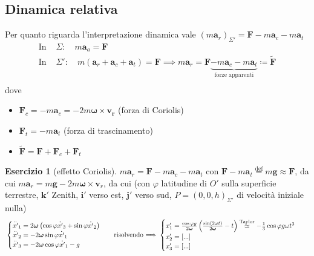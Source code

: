 \documentclass[a4paper,10pt]{article}
\providecommand{\exercisename}{Esercizio}
\theoremstyle{definition}
\newtheorem*{xca*}{\protect\exercisename}
\newcommand{\bv}{\boldsymbol} %
\theoremstyle{indentdefinition}
\theoremstyle{indenttheorem}
\theoremstyle{myremark}
\theoremstyle{indentgeneral}
\begin{document}
\subsection{Dinamica relativa}
Per quanto riguarda l'interpretazione dinamica vale $\left(m\boldsymbol{a}_{r}\right)_{\Sigma'}=\boldsymbol{F}-m\boldsymbol{a}_{c}-m\boldsymbol{a}_{t}$
\begin{align*}
    \text{In }&\Sigma:\quad m\bv{a}_a=\bv{F} \\
    \text{In }&\Sigma':\quad m(\bv{a}_r+\bv{a}_c+\bv{a}_t)=\bv{F} \implies m\bv{a}_r=\bv{F}\underbrace{-m\bv{a}_c-m\bv{a}_t}_{\text{forze apparenti}} \coloneqq \widetilde{\bv{F}}\\
\end{align*}
dove
\begin{itemize}
    \item $\bv{F}_c=-m\bv{a}_c=-2m\bv{\omega\times\bv{v}_r}$ (forza di Coriolis)
    \item $\bv{F}_t=-m\bv{a}_t$ (forza di trascinamento)
    \item $\widetilde{\bv{F}}=\bv{F}+\bv{F}_c+\bv{F}_t$
\end{itemize}

%
\begin{xca*}[effetto Coriolis]
$m\boldsymbol{a}_{r}=\boldsymbol{F}-m\boldsymbol{a}_{c}-m\boldsymbol{a}_{t}$
con $\boldsymbol{F}-m\boldsymbol{a}_{t}\overset{\text{def}}{=}m\boldsymbol{g}\approx\boldsymbol{F}$,
da cui $m\boldsymbol{a}_{r}=m\boldsymbol{g}-2m\boldsymbol{\omega}\times\boldsymbol{v}_{r}$,
da cui (con $\varphi$ latitudine di $O'$ sulla superficie terrestre,
$\boldsymbol{k}'$ Zenith, $\boldsymbol{i}'$ verso est, $\boldsymbol{j}'$
verso sud, $P=\left(0,0,h\right)_{\Sigma'}$ di velocità iniziale
nulla)
\begin{align*}
 & \begin{cases}
\ddot{x'}_{1}=2\boldsymbol{\omega}\left(\cos\varphi\dot{x'}_{3}+\sin\varphi\dot{x'}_{2}\right)\\
\ddot{x'}_{2}=-2\boldsymbol{\omega}\sin\varphi\dot{x'}_{1}\\
\ddot{x'}_{3}=-2\boldsymbol{\omega}\cos\varphi\dot{x'}_{1}-g
\end{cases} & \text{risolvendo \ensuremath{\Longrightarrow} } & \begin{cases}
x'_{1}=\frac{\cos\varphi g}{2\boldsymbol{\omega}}\left(\frac{\sin\left(2\omega t\right)}{2\boldsymbol{\omega}}-t\right)\overset{\text{Taylor}}{\simeq}-\frac{1}{3}\cos\varphi g\omega t^{3}\\
x'_{2}=\text{[...]}\\
x'_{3}=\text{[...]}
\end{cases}
\end{align*}
\end{xca*}
\end{document}
